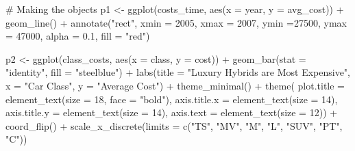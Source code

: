 \documentclass[
  letterpaper,
  DIV=11,
  numbers=noendperiod]{scrreprt}
\newenvironment{Shaded}{\begin{snugshade}}{\end{snugshade}}
\newcommand{\AttributeTok}[1]{\textcolor[rgb]{0.40,0.45,0.13}{#1}}
\newcommand{\CommentTok}[1]{\textcolor[rgb]{0.37,0.37,0.37}{#1}}
\newcommand{\DecValTok}[1]{\textcolor[rgb]{0.68,0.00,0.00}{#1}}
\newcommand{\FloatTok}[1]{\textcolor[rgb]{0.68,0.00,0.00}{#1}}
\newcommand{\FunctionTok}[1]{\textcolor[rgb]{0.28,0.35,0.67}{#1}}
\newcommand{\NormalTok}[1]{\textcolor[rgb]{0.00,0.23,0.31}{#1}}
\newcommand{\OtherTok}[1]{\textcolor[rgb]{0.00,0.23,0.31}{#1}}
\newcommand{\SpecialCharTok}[1]{\textcolor[rgb]{0.37,0.37,0.37}{#1}}
\newcommand{\StringTok}[1]{\textcolor[rgb]{0.13,0.47,0.30}{#1}}
\begin{document}
\begin{Shaded}
\begin{Highlighting}[]
\CommentTok{\# Making the objects}
\NormalTok{p1 }\OtherTok{\textless{}{-}} \FunctionTok{ggplot}\NormalTok{(costs\_time, }\FunctionTok{aes}\NormalTok{(}\AttributeTok{x =}\NormalTok{ year, }\AttributeTok{y =}\NormalTok{ avg\_cost)) }\SpecialCharTok{+}
  \FunctionTok{geom\_line}\NormalTok{() }\SpecialCharTok{+}
  \FunctionTok{annotate}\NormalTok{(}\StringTok{"rect"}\NormalTok{, }\AttributeTok{xmin =} \DecValTok{2005}\NormalTok{, }\AttributeTok{xmax =} \DecValTok{2007}\NormalTok{, }\AttributeTok{ymin =}\DecValTok{27500}\NormalTok{, }\AttributeTok{ymax =} \DecValTok{47000}\NormalTok{, }\AttributeTok{alpha =} \FloatTok{0.1}\NormalTok{, }\AttributeTok{fill =} \StringTok{"red"}\NormalTok{)}

\NormalTok{p2 }\OtherTok{\textless{}{-}} \FunctionTok{ggplot}\NormalTok{(class\_costs, }\FunctionTok{aes}\NormalTok{(}\AttributeTok{x =}\NormalTok{ class, }\AttributeTok{y =}\NormalTok{ cost)) }\SpecialCharTok{+}
  \FunctionTok{geom\_bar}\NormalTok{(}\AttributeTok{stat =} \StringTok{"identity"}\NormalTok{, }\AttributeTok{fill =} \StringTok{"steelblue"}\NormalTok{) }\SpecialCharTok{+}
  \FunctionTok{labs}\NormalTok{(}\AttributeTok{title =} \StringTok{"Luxury Hybrids are Most Expensive"}\NormalTok{, }
       \AttributeTok{x =} \StringTok{"Car Class"}\NormalTok{, }
       \AttributeTok{y =} \StringTok{"Average Cost"}\NormalTok{) }\SpecialCharTok{+}
  \FunctionTok{theme\_minimal}\NormalTok{() }\SpecialCharTok{+}
  \FunctionTok{theme}\NormalTok{(}
    \AttributeTok{plot.title =} \FunctionTok{element\_text}\NormalTok{(}\AttributeTok{size =} \DecValTok{18}\NormalTok{, }\AttributeTok{face =} \StringTok{"bold"}\NormalTok{),}
    \AttributeTok{axis.title.x =} \FunctionTok{element\_text}\NormalTok{(}\AttributeTok{size =} \DecValTok{14}\NormalTok{),}
    \AttributeTok{axis.title.y =} \FunctionTok{element\_text}\NormalTok{(}\AttributeTok{size =} \DecValTok{14}\NormalTok{),}
    \AttributeTok{axis.text =} \FunctionTok{element\_text}\NormalTok{(}\AttributeTok{size =} \DecValTok{12}\NormalTok{)) }\SpecialCharTok{+}
  \FunctionTok{coord\_flip}\NormalTok{() }\SpecialCharTok{+}
  \FunctionTok{scale\_x\_discrete}\NormalTok{(}\AttributeTok{limits =} \FunctionTok{c}\NormalTok{(}\StringTok{"TS"}\NormalTok{, }\StringTok{"MV"}\NormalTok{, }\StringTok{"M"}\NormalTok{, }\StringTok{"L"}\NormalTok{, }\StringTok{"SUV"}\NormalTok{, }\StringTok{"PT"}\NormalTok{, }\StringTok{"C"}\NormalTok{))}


\end{Highlighting}
\end{Shaded}
\end{document}

